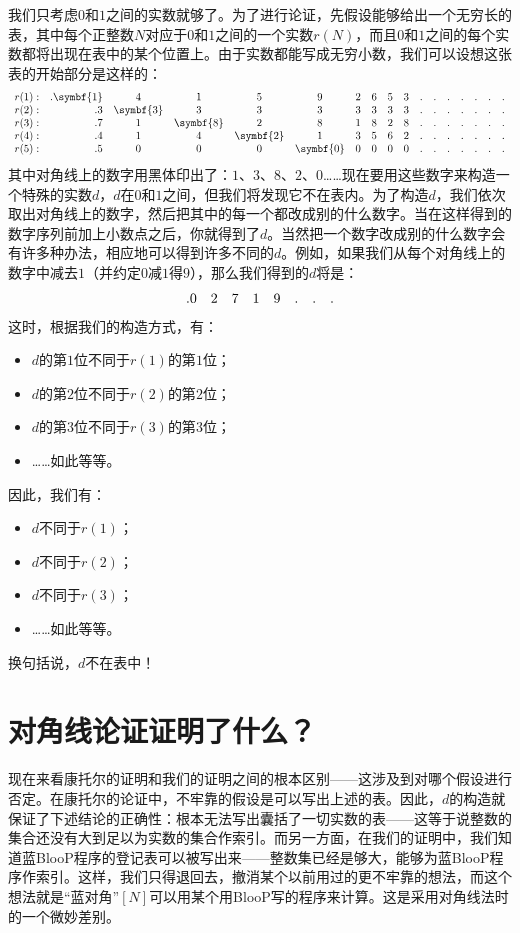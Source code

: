 我们只考虑$0$和$1$之间的实数就够了。为了进行论证，先假设能够给出一个无穷长的表，其中每个正整数$N$对应于$0$和$1$之间的一个实数$r(N)$，而且$0$和$1$之间的每个实数都将出现在表中的某个位置上。由于实数都能写成无穷小数，我们可以设想这张表的开始部分是这样的：
\[
\begin{array}{rr*{15}c}
r(1):&.\symbf{1}&4&1&5&9&2&6&5&3&.&.&.&.&.&.&.\\
r(2):&.3&\symbf{3}&3&3&3&3&3&3&3&.&.&.&.&.&.&.\\
r(3):&.7&1&\symbf{8}&2&8&1&8&2&8&.&.&.&.&.&.&.\\
r(4):&.4&1&4&\symbf{2}&1&3&5&6&2&.&.&.&.&.&.&.\\
r(5):&.5&0&0&0&\symbf{0}&0&0&0&0&.&.&.&.&.&.&.
\end{array}
\]
其中对角线上的数字用黑体印出了：$1$、$3$、$8$、$2$、$0$……现在要用这些数字来构造一个特殊的实数$d$，$d$在$0$和$1$之间，但我们将发现它不在表内。为了构造$d$，我们依次取出对角线上的数字，然后把其中的每一个都改成别的什么数字。当在这样得到的数字序列前加上小数点之后，你就得到了$d$。当然把一个数字改成别的什么数字会有许多种办法，相应地可以得到许多不同的$d$。例如，如果我们从每个对角线上的数字中减去$1$（并约定$0$减$1$得$9$），那么我们得到的$d$将是：
\[
\begin{array}{*8l}
.0&2&7&1&9&.&.&.
\end{array}
\]
这时，根据我们的构造方式，有：
\begin{itemize}
\item $d$的第$1$位不同于$r(1)$的第$1$位；
\item $d$的第$2$位不同于$r(2)$的第$2$位；
\item $d$的第$3$位不同于$r(3)$的第$3$位；
\item ……如此等等。
\end{itemize}
因此，我们有：
\begin{itemize}
\item $d$不同于$r(1)$；
\item $d$不同于$r(2)$；
\item $d$不同于$r(3)$；
\item ……如此等等。
\end{itemize}
换句括说，$d$不在表中！

\section{对角线论证证明了什么？}

现在来看康托尔的证明和我们的证明之间的根本区别——这涉及到对哪个假设进行否定。在康托尔的论证中，不牢靠的假设是可以写出上述的表。因此，$d$的构造就保证了下述结论的正确性：根本无法写出囊括了一切实数的表——这等于说整数的集合还没有大到足以为实数的集合作索引。而另一方面，在我们的证明中，我们知道蓝BlooP程序的登记表可以被写出来——整数集已经是够大，能够为蓝BlooP程序作索引。这样，我们只得退回去，撤消某个以前用过的更不牢靠的想法，而这个想法就是“蓝对角”$[N]$可以用某个用BlooP写的程序来计算。这是采用对角线法时的一个微妙差别。

